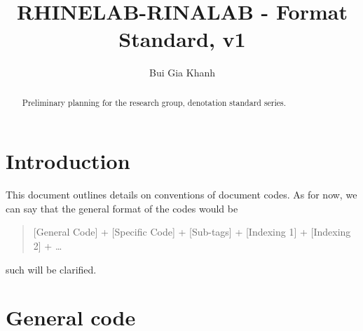 \documentclass[9pt,a4paper]{article}
\title{RHINELAB-RINALAB - Format Standard, v1} %
\author{Bui Gia Khanh} %
\affiliation{} %
\begin{document}
\maketitle

\begin{abstract}
    \noindent
    Preliminary planning for the research group, denotation standard series.  

\end{abstract}

\vspace{2.5cm}



\thispagestyle{firstpage}

\pagebreak


\newgeometry{} %

\section{Introduction}

This document outlines details on conventions of document codes. As for now, we can say that the general format of the codes would be
\begin{quote}
    [General Code] + [Specific Code] + [Sub-tags] + [Indexing 1] + [Indexing 2] + \dots
\end{quote}
such will be clarified. 

\section{General code}
\end{document}
